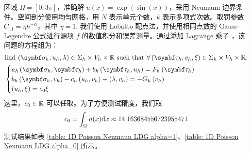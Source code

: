 区域 \(\Omega = [0,3\pi]\)，准确解 \(u(x) = \exp\left(\sin(x)\right)\)，采用 Neumann 边界条件。空间剖分使用均匀网格，用 \(N\) 表示单元个数，\(k\) 表示多项式次数。取罚参数 \(C_{11} = \eta h^{-\alpha}\)，其中 \(\eta = 1\). 我们使用 Lobatto 配点法，并使用相同点数的 Gauss-Legendre 公式进行源项 \(f\) 的数值积分和误差测量。通过添加 Lagrange 乘子 \cite{10.1007/BF01436561}，该问题的方程组为：
\begin{equation}
	\begin{aligned}
		& \text{find \(\left(\bm\sigma_{h}, u_{h}, \lambda\right) \in \Sigma_{h} \times V_{h} \times \R\) such that \(\forall \left(\bm\tau_{h}, v_{h}, \xi\right) \in \Sigma_{h} \times V_{h} \times \R\):} \\
		& \begin{cases}
			a_{h}\left(\bm\sigma_{h}, \bm\tau_h\right) + b_{h}\left(\bm\tau_{h}, u_{h}\right) = F_{h}\left(\bm\tau_{h}\right) \\
			b_{h}\left(\bm\sigma_{h}, v_{h}\right) - c_{h}\left(u_{h}, v_{h}\right) + \left(\lambda, v_{h}\right) = -G_{h}\left(v_{h}\right) \\
			\left(u_{h}, \xi\right) = c_0 \xi
		\end{cases}
	\end{aligned}
\end{equation}
这里，\(c_0 \in \mathbb{R}\) 可以任取。为了方便测试精度，我们取
\begin{equation}
	c_0 = \int_{\Omega} u(x)\mathrm{d} x
	\approx 14.163684556723955471
\end{equation}
测试结果如表 \ref{table: 1D Poisson Neumann LDG alpha=1}、\ref{table: 1D Poisson Neumann LDG alpha=0} 所示。

